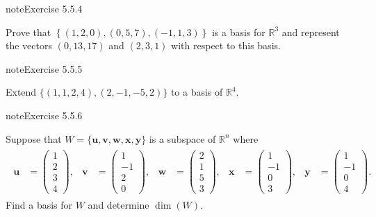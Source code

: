 \documentclass[letterpaper,10pt,english]{jupyterBook}
\begin{document}
\begin{sphinxadmonition}{note}{Exercise 5.5.4}



\sphinxAtStartPar
Prove that \(\left\{ (1, 2, 0), (0, 5, 7), (-1, 1, 3) \right\}\) is a basis for \(\mathbb{R}^3\) and represent the vectors \((0, 13, 17)\) and \((2, 3, 1)\) with respect to this basis.
\end{sphinxadmonition}
 \label{exercise:vector-spaces-ex-R4-basis}

\begin{sphinxadmonition}{note}{Exercise 5.5.5}



\sphinxAtStartPar
Extend \(\{ (1, 1, 2, 4), (2, -1, -5, 2)\}\) to a basis of \(\mathbb{R}^4\).
\end{sphinxadmonition}
 \label{exercise:vector-spaces-ex-R4-basis-2}

\begin{sphinxadmonition}{note}{Exercise 5.5.6}



\sphinxAtStartPar
Suppose that \(W = \{\mathbf{u}, \mathbf{v}, \mathbf{w}, \mathbf{x}, \mathbf{y}\}\) is a subspace of \(\mathbb{R}^n\) where
\begin{equation*}
\begin{split} \begin{align*}
    \mathbf{u} &= \begin{pmatrix} 1 \\ 2 \\ 3 \\ 4 \end{pmatrix}, &
    \mathbf{v} &= \begin{pmatrix} 1 \\ -1 \\ 2 \\ 0 \end{pmatrix}, &
    \mathbf{w} &= \begin{pmatrix} 2 \\ 1 \\ 5 \\ 3 \end{pmatrix}, &
    \mathbf{x} &= \begin{pmatrix} 1 \\ -1 \\ 0 \\ 3 \end{pmatrix}, &
    \mathbf{y} &= \begin{pmatrix} 1 \\ -1 \\ 0 \\ 4 \end{pmatrix}.
\end{align*} \end{split}
\end{equation*}
\sphinxAtStartPar
Find a basis for \(W\) and determine \(\dim(W)\).
\end{sphinxadmonition}
\end{document}
